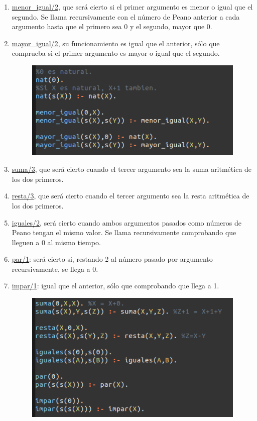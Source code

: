 \documentclass{article}
\begin{document}
\begin{enumerate}
\begin{enumerate}
\item  \underline{menor\_igual/2}, que será cierto si el primer argumento es menor o igual que el segundo. Se llama recursivamente con el número de Peano anterior a cada argumento hasta que el primero sea 0 y el segundo, mayor que 0.

\item  \underline{mayor\_igual/2}, su funcionamiento es igual que el anterior, sólo que comprueba si el primer argumento es mayor o igual que el segundo.

\begin{figure}[H]
	\centering
	\includegraphics[width=0.75 \textwidth]{images/reglas1.png}
\end{figure}

\item  \underline{suma/3}, que será cierto cuando el tercer argumento sea la suma aritmética de los dos primeros.

\item  \underline{resta/3}, que será cierto cuando el tercer argumento sea la resta aritmética de los dos primeros.
\item  \underline{iguales/2}, será cierto cuando ambos argumentos pasados como números de Peano tengan el mismo valor. Se llama recursivamente comprobando que lleguen a 0 al mismo tiempo.

\item  \underline{par/1}: será cierto si, restando 2 al número pasado por argumento recursivamente, se llega a 0.

\item  \underline{impar/1}: igual que el anterior, sólo que comprobando que llega a 1.

\begin{figure}[H]
	\centering
	\includegraphics[width=0.75 \textwidth]{images/reglas2.png}
\end{figure}


\end{enumerate}
\end{enumerate}
\end{document}
